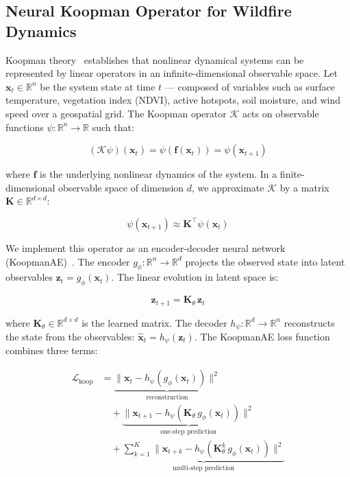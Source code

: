 \documentclass[preprint,12pt,times,numbers]{elsarticle}
\begin{document}
\subsection{Neural Koopman Operator for Wildfire Dynamics}
\label{sec:koopman}

Koopman theory~\cite{article:koopman1931,article:rowley2009,article:mezic2013} establishes that nonlinear dynamical systems can be represented by linear operators in an infinite-dimensional observable space. Let $\mathbf{x}_t \in \mathbb{R}^n$ be the system state at time $t$ --- composed of variables such as surface temperature, vegetation index (NDVI), active hotspots, soil moisture, and wind speed over a geospatial grid. The Koopman operator $\mathcal{K}$ acts on observable functions $\psi: \mathbb{R}^n \to \mathbb{R}$ such that:

\begin{equation}
(\mathcal{K} \psi)(\mathbf{x}_t) = \psi(\mathbf{f}(\mathbf{x}_t)) = \psi(\mathbf{x}_{t+1})
\label{eq:koopman_def}
\end{equation}

where $\mathbf{f}$ is the underlying nonlinear dynamics of the system. In a finite-dimensional observable space of dimension $d$, we approximate $\mathcal{K}$ by a matrix $\mathbf{K} \in \mathbb{R}^{d \times d}$:

\begin{equation}
\psi(\mathbf{x}_{t+1}) \approx \mathbf{K}^\top \psi(\mathbf{x}_t)
\label{eq:koopman_lin}
\end{equation}

We implement this operator as an encoder-decoder neural network (KoopmanAE)~\cite{article:lusch2018,article:takeishi2017}. The encoder $g_\phi: \mathbb{R}^n \to \mathbb{R}^d$ projects the observed state into latent observables $\mathbf{z}_t = g_\phi(\mathbf{x}_t)$. The linear evolution in latent space is:

\begin{equation}
\mathbf{z}_{t+1} = \mathbf{K}_\theta \, \mathbf{z}_t
\label{eq:latent_evolution}
\end{equation}

where $\mathbf{K}_\theta \in \mathbb{R}^{d \times d}$ is the learned matrix. The decoder $h_\psi: \mathbb{R}^d \to \mathbb{R}^n$ reconstructs the state from the observables: $\hat{\mathbf{x}}_t = h_\psi(\mathbf{z}_t)$. The KoopmanAE loss function combines three terms:

\begin{align}
\mathcal{L}_{\text{koop}} &= \underbrace{\|\mathbf{x}_t - h_\psi(g_\phi(\mathbf{x}_t))\|^2}_{\text{reconstruction}} \nonumber \\
&\quad + \underbrace{\|\mathbf{x}_{t+1} - h_\psi(\mathbf{K}_\theta \, g_\phi(\mathbf{x}_t))\|^2}_{\text{one-step prediction}} \nonumber \\
&\quad + \underbrace{\sum_{k=1}^{K} \|\mathbf{x}_{t+k} - h_\psi(\mathbf{K}_\theta^k \, g_\phi(\mathbf{x}_t))\|^2}_{\text{multi-step prediction}}
\label{eq:koopman_loss}
\end{align}
\end{document}
